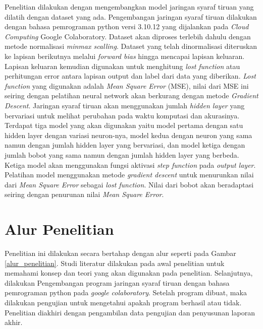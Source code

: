 Penelitian dilakukan dengan mengembangkan model jaringan syaraf tiruan yang dilatih dengan dataset yang ada. Pengembangan jaringan syaraf tiruan dilakukan dengan bahasa pemrograman python versi 3.10.12 yang dijalankan pada \textit{Cloud Computing} Google Colaboratory. Dataset akan diproses terlebih dahulu dengan metode normalisasi \textit{minmax scalling}. Dataset yang telah dinormalisasi diteruskan ke lapisan berikutnya melalui \textit{forward bias} hingga mencapai lapisan keluaran. Lapisan keluaran kemudian digunakan untuk menghitung \textit{lost function} atau perhitungan error antara lapisan output dan label dari data yang diberikan. \textit{Lost function} yang digunakan adalah \textit{Mean Square Error} (MSE), nilai dari MSE ini seiring dengan pelatihan neural network akan berkurang dengan metode \textit{Gradient Descent}. Jaringan syaraf tiruan akan menggunakan jumlah \textit{hidden layer} yang bervariasi untuk melihat perubahan pada waktu komputasi dan akurasinya. Terdapat tiga model yang akan digunakan yaitu model pertama dengan satu hidden layer dengan variasi neuron-nya, model kedua dengan neuron yang sama namun dengan jumlah hidden layer yang bervariasi, dan model ketiga dengan jumlah bobot yang sama namun dengan jumlah hidden layer yang berbeda. Ketiga model akan menggunakan fungsi aktivasi \textit{step function} pada \textit{output layer}. Pelatihan model menggunakan metode \textit{gradient descent} untuk menurunkan nilai dari \textit{Mean Square Error} sebagai \textit{lost function}. Nilai dari bobot akan beradaptasi seiring dengan penurunan nilai \textit{Mean Square Error}.

\section{Alur Penelitian}

Penelitian ini dilakukan secara bertahap dengan alur seperti pada Gambar \ref{alur_penelitian}.
Studi literatur dilakukan pada awal penelitian untuk memahami konsep dan teori yang akan digunakan pada penelitian. Selanjutnya, dilakukan Pengembangan program jaringan syaraf tiruan dengan bahasa pemrograman python pada \textit{google colaboratory}. Setelah program dibuat, maka dilakukan pengujian untuk mengetahui apakah program berhasil atau tidak. Penelitian diakhiri dengan pengambilan data pengujian dan penyusunan laporan akhir.

